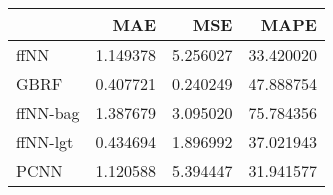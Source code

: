 \begin{tabular}{lrrr}
\toprule
{} &       MAE &       MSE &       MAPE \\
\midrule
ffNN     &  1.149378 &  5.256027 &  33.420020 \\
GBRF     &  0.407721 &  0.240249 &  47.888754 \\
ffNN-bag &  1.387679 &  3.095020 &  75.784356 \\
ffNN-lgt &  0.434694 &  1.896992 &  37.021943 \\
PCNN     &  1.120588 &  5.394447 &  31.941577 \\
\bottomrule
\end{tabular}
